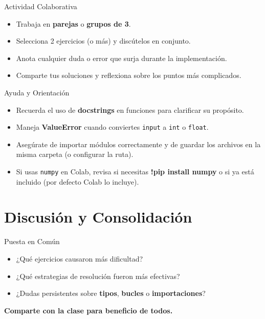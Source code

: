 \documentclass[10pt]{beamer}
\begin{document}
\begin{frame}{Actividad Colaborativa}
  \begin{itemize}
    \item Trabaja en \textbf{parejas} o \textbf{grupos de 3}.
    \item Selecciona 2 ejercicios (o más) y discútelos en conjunto.
    \item Anota cualquier duda o error que surja durante la implementación.
    \item Comparte tus soluciones y reflexiona sobre los puntos más complicados.
  \end{itemize}
\end{frame}

\begin{frame}{Ayuda y Orientación}
  \begin{itemize}
    \item Recuerda el uso de \textbf{docstrings} en funciones para clarificar su propósito.
    \item Maneja \textbf{ValueError} cuando conviertes \texttt{input} a \texttt{int} o \texttt{float}.
    \item Asegúrate de importar módulos correctamente y de guardar los archivos en la misma carpeta (o configurar la ruta).
    \item Si usas \texttt{numpy} en Colab, revisa si necesitas \textbf{!pip install numpy} o si ya está incluido (por defecto Colab lo incluye).
  \end{itemize}
\end{frame}

\section{Discusión y Consolidación}

\begin{frame}{Puesta en Común}
  \begin{itemize}
    \item ¿Qué ejercicios causaron más dificultad?
    \item ¿Qué estrategias de resolución fueron más efectivas?
    \item ¿Dudas persistentes sobre \textbf{tipos}, \textbf{bucles} o \textbf{importaciones}?
  \end{itemize}
  \vspace{0.3cm}
  \textbf{Comparte con la clase para beneficio de todos.}
\end{frame}
\end{document}

